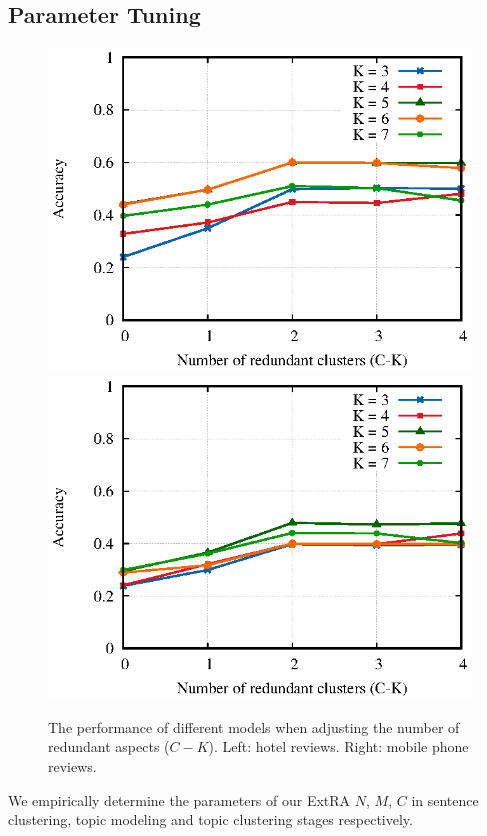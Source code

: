 \subsection{Parameter Tuning}
\begin{figure}[t]
	\centering  
	{\includegraphics[width=0.8\columnwidth]{data/redundant_clusters_hotel}
\hspace*{1cm} \includegraphics[width=0.8\columnwidth]{data/redundant_clusters_mobile}}
	\vfill
	\caption{The performance of different models when adjusting the 
		number of redundant aspects ($C-K$).  Left: hotel reviews. Right: mobile phone reviews. 	\label{fig:differentc} }

\end{figure} 
We empirically determine the parameters of our ExtRA $N$, $M$, $C$ in sentence clustering, 
topic modeling and topic clustering stages respectively.

